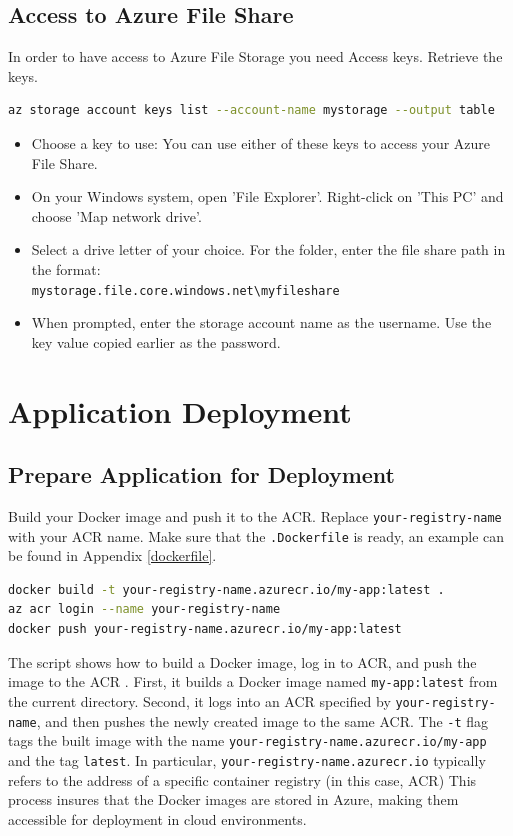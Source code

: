\documentclass{article}
\begin{document}
\subsection{Access to Azure File Share}

In order to have access to Azure File Storage you need Access keys.
Retrieve the keys.
\begin{lstlisting}[language=bash]
az storage account keys list --account-name mystorage --output table
\end{lstlisting}
\begin{itemize}
\item Choose a key to use: You can use either of these keys to access your Azure File Share. 
\item On your Windows system, open 'File Explorer'. Right-click on 'This PC' and choose 'Map network drive'. 
\item Select a drive letter of your choice. For the folder, enter the file share path in the format: \texttt{\\ mystorage.file.core.windows.net\textbackslash myfileshare}
\item  When prompted, enter the storage account name as the username. Use the key value copied earlier as the password.
\end{itemize}

\section{Application Deployment} 
\subsection{Prepare Application for Deployment}

Build your Docker image \cite{dockerbuild} and push it to the ACR. Replace \texttt{your-registry-name} with your ACR name. Make sure that the \texttt{.Dockerfile}  is ready, an example can be found in Appendix \ref{dockerfile}.

\begin{lstlisting}[language=bash]
docker build -t your-registry-name.azurecr.io/my-app:latest .
az acr login --name your-registry-name
docker push your-registry-name.azurecr.io/my-app:latest
\end{lstlisting}

The script shows how to build a Docker image, log in to ACR, and push the image to the ACR . First, it builds a Docker image named \texttt{my-app:latest} from the current directory. Second, it logs into an ACR specified by \texttt{your-registry-name}, and then pushes the newly created image to the same ACR.  The \texttt{-t} flag tags the built image with the name \texttt{your-registry-name.azurecr.io/my-app} and the tag \texttt{latest}. In particular, \texttt{your-registry-name.azurecr.io} typically refers to the address of a specific container registry (in this case, ACR) This process insures that the Docker images are stored in Azure, making them accessible for deployment in cloud environments.  
\end{document}

